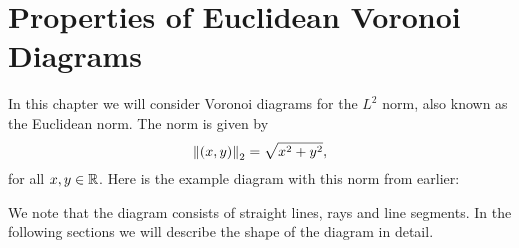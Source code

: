 \chapter{Properties of Euclidean Voronoi Diagrams}

%
%
In this chapter we will consider Voronoi diagrams for the $L^2$ norm, also known as the Euclidean norm. The norm is given by
\[
    \left\lVert (x, y) \right\rVert_2 = \sqrt{x^2 + y^2},
\]
for all $x, y \in \mathbb{R}$. Here is the example diagram with this norm from earlier:
\begin{figure}[H]
    \centering
\end{figure}
We note that the diagram consists of straight lines, rays and line segments. In the following sections we will describe the shape of the diagram in detail.

%
%

